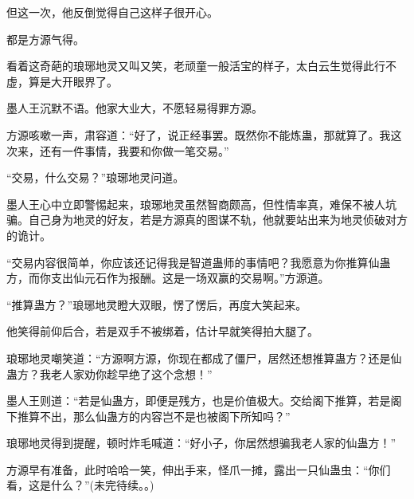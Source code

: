 \begin{this_body}
但这一次，他反倒觉得自己这样子很开心。

都是方源气得。

看着这奇葩的琅琊地灵又叫又笑，老顽童一般活宝的样子，太白云生觉得此行不虚，算是大开眼界了。

墨人王沉默不语。他家大业大，不愿轻易得罪方源。

方源咳嗽一声，肃容道：“好了，说正经事罢。既然你不能炼蛊，那就算了。我这次来，还有一件事情，我要和你做一笔交易。”

“交易，什么交易？”琅琊地灵问道。

墨人王心中立即警惕起来，琅琊地灵虽然智商颇高，但性情率真，难保不被人坑骗。自己身为地灵的好友，若是方源真的图谋不轨，他就要站出来为地灵侦破对方的诡计。

“交易内容很简单，你应该还记得我是智道蛊师的事情吧？我愿意为你推算仙蛊方，而你支出仙元石作为报酬。这是一场双赢的交易啊。”方源道。

“推算蛊方？”琅琊地灵瞪大双眼，愣了愣后，再度大笑起来。

他笑得前仰后合，若是双手不被绑着，估计早就笑得拍大腿了。

琅琊地灵嘲笑道：“方源啊方源，你现在都成了僵尸，居然还想推算蛊方？还是仙蛊方？我老人家劝你趁早绝了这个念想！”

墨人王则道：“若是仙蛊方，即便是残方，也是价值极大。交给阁下推算，若是阁下推算不出，那么仙蛊方的内容岂不是也被阁下所知吗？”

琅琊地灵得到提醒，顿时炸毛喊道：“好小子，你居然想骗我老人家的仙蛊方！”

方源早有准备，此时哈哈一笑，伸出手来，怪爪一摊，露出一只仙蛊虫：“你们看，这是什么？”(未完待续。。)

\end{this_body}

